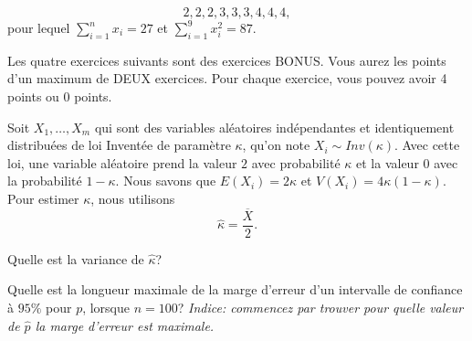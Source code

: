 \begin{questions}
$$2,2,2,3,3,3,4,4,4,$$
pour lequel $\displaystyle\sum_{i=1}^n x_i=27$ et $\displaystyle\sum_{i=1}^9x_i^2=87$.


\pageblanche

\Large Les quatre exercices suivants sont des exercices BONUS. Vous aurez les points d'un maximum de DEUX exercices. Pour chaque exercice, vous pouvez avoir 4 points ou 0 points. 

\normalsize

\vspace{2cm}
\bonusquestion[4] Soit $X_1,\hdots,X_m$ qui sont des variables aléatoires indépendantes et identiquement distribuées de loi Inventée de paramètre $\kappa$, qu'on note $X_i\sim Inv(\kappa)$. 
Avec cette loi, une variable aléatoire prend la valeur $2$ avec probabilité $\kappa$ et la valeur $0$ avec la probabilité $1-\kappa$.
Nous savons que $E(X_i)=2\kappa$ et $V(X_i)=4\kappa(1-\kappa)$.
Pour estimer $\kappa$, nous utilisons $$\displaystyle \hat{\kappa}=\frac{\overline{X}}{2}.$$

Quelle est la variance de $\hat{\kappa}$?


\pageblanche
\bonusquestion[4] Quelle est la longueur maximale de la marge d'erreur d'un intervalle de confiance à $95\%$ pour $p$, lorsque $n=100$? \textit{Indice: commencez par trouver pour quelle valeur de $\hat{p}$ la marge d'erreur est maximale.}

\pageblanche
\bonusquestion[4] 


\end{questions}
